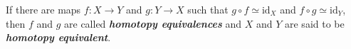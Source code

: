 \documentclass[preview]{standalone}
\begin{document}
\begin{center}
If there are maps $f:X\to Y$ and $g:Y\to X$ such that $g\circ f\simeq \text{id}_X$ and $f\circ g\simeq \text{id}_Y$, then $f$ and $g$ are called \textbf{\textit{homotopy equivalences}} and $X$ and $Y$ are said to be \textbf{\textit{homotopy equivalent}}.
\end{center}
\end{document}
